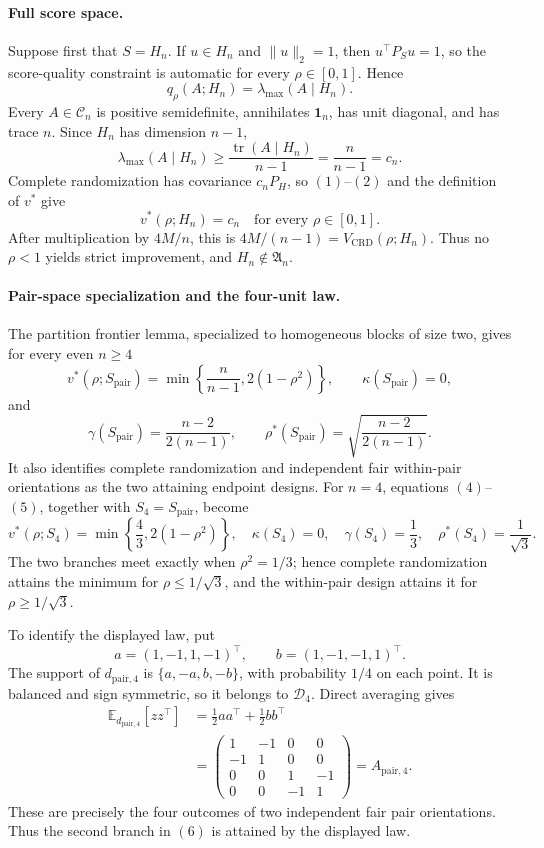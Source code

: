 \paragraph{Full score space.}
Suppose first that \(S=H_n\).  If \(u\in H_n\) and \(\|u\|_2=1\), then \(u^\top P_Su=1\), so the score-quality constraint is automatic for every \(\rho\in[0,1]\).  Hence
\[
q_\rho(A;H_n)=\lambda_{\max}(A\mid H_n).
\tag{1}
\]
Every \(A\in\mathcal C_n\) is positive semidefinite, annihilates \(\mathbf1_n\), has unit diagonal, and has trace \(n\).  Since \(H_n\) has dimension \(n-1\),
\[
\lambda_{\max}(A\mid H_n)
\geq\frac{\operatorname{tr}(A\mid H_n)}{n-1}
=\frac{n}{n-1}=c_n.
\tag{2}
\]
Complete randomization has covariance \(c_nP_H\), so \((1)\)--\((2)\) and the definition of \(v^*\) give
\[
v^*(\rho;H_n)=c_n
\quad\text{for every }\rho\in[0,1].
\tag{3}
\]
After multiplication by \(4M/n\), this is \(4M/(n-1)=V_{\mathrm{CRD}}(\rho;H_n)\).  Thus no \(\rho<1\) yields strict improvement, and \(H_n\notin\mathfrak A_n\).

\paragraph{Pair-space specialization and the four-unit law.}
The partition frontier lemma, specialized to homogeneous blocks of size two, gives for every even \(n\geq4\)
\[
v^*(\rho;S_{\mathrm{pair}})
=\min\left\{\frac{n}{n-1},2(1-\rho^2)\right\},
\qquad
\kappa(S_{\mathrm{pair}})=0,
\tag{4}
\]
and
\[
\gamma(S_{\mathrm{pair}})=\frac{n-2}{2(n-1)},
\qquad
\rho^*(S_{\mathrm{pair}})
=\sqrt{\frac{n-2}{2(n-1)}}.
\tag{5}
\]
It also identifies complete randomization and independent fair within-pair orientations as the two attaining endpoint designs.  For \(n=4\), equations \((4)\)--\((5)\), together with \(S_4=S_{\mathrm{pair}}\), become
\[
v^*(\rho;S_4)=\min\left\{\frac43,2(1-\rho^2)\right\},
\quad
\kappa(S_4)=0,
\quad
\gamma(S_4)=\frac13,
\quad
\rho^*(S_4)=\frac1{\sqrt3}.
\tag{6}
\]
The two branches meet exactly when \(\rho^2=1/3\); hence complete randomization attains the minimum for \(\rho\leq1/\sqrt3\), and the within-pair design attains it for \(\rho\geq1/\sqrt3\).

To identify the displayed law, put
\[
a=(1,-1,1,-1)^\top,
\qquad
b=(1,-1,-1,1)^\top.
\]
The support of \(d_{\mathrm{pair},4}\) is \(\{a,-a,b,-b\}\), with probability \(1/4\) on each point.  It is balanced and sign symmetric, so it belongs to \(\mathcal D_4\).  Direct averaging gives
\[
\begin{aligned}
\mathbb E_{d_{\mathrm{pair},4}}[zz^\top]
&=\frac12aa^\top+\frac12bb^\top\\
&=
\begin{pmatrix}
1&-1&0&0\\
-1&1&0&0\\
0&0&1&-1\\
0&0&-1&1
\end{pmatrix}
=A_{\mathrm{pair},4}.
\end{aligned}
\tag{7}
\]
These are precisely the four outcomes of two independent fair pair orientations.  Thus the second branch in \((6)\) is attained by the displayed law.

